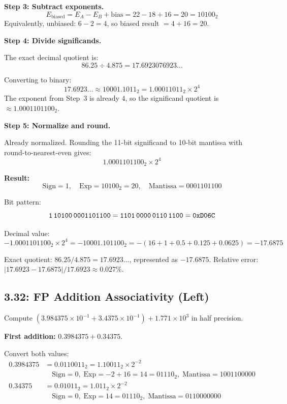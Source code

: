 \noindent\textbf{Step 3: Subtract exponents.}
\[
  E_{\text{biased}} = E_A - E_B + \text{bias} = 22 - 18 + 16 = 20 = 10100_2
\]
Equivalently, unbiased: $6 - 2 = 4$, so biased result $= 4 + 16 = 20$.

\noindent\textbf{Step 4: Divide significands.}

The exact decimal quotient is:
\[
  86.25 \div 4.875 = 17.6923076923\ldots
\]

Converting to binary:
\[
  17.6923\ldots \approx 10001.1011_2 = 1.00011011_2 \times 2^4
\]
The exponent from Step~3 is already $4$, so the significand quotient is
$\approx 1.0001101100_2$.

\noindent\textbf{Step 5: Normalize and round.}

Already normalized. Rounding the 11-bit significand to 10-bit mantissa
with round-to-nearest-even gives:
\[
  1.0001101100_2 \times 2^4
\]

\noindent\textbf{Result:}
\[
  \text{Sign} = 1,\quad
  \text{Exp} = 10100_2 = 20,\quad
  \text{Mantissa} = 0001101100
\]

Bit pattern:
\[
  \texttt{1\,10100\,0001101100}
  = \texttt{1101\,0000\,0110\,1100}
  = \texttt{0xD06C}
\]

Decimal value:
\[
  -1.0001101100_2 \times 2^4
  = -10001.101100_2
  = -(16 + 1 + 0.5 + 0.125 + 0.0625)
  = -17.6875
\]

Exact quotient: $86.25 / 4.875 = 17.6923\ldots$, represented as $-17.6875$.
Relative error: $|17.6923 - 17.6875| / 17.6923 \approx 0.027\%$.

\subsection*{3.32: FP Addition Associativity (Left)}
\hypertarget{sol-3.32}{}

Compute $(3.984375 \times 10^{-1} + 3.4375 \times 10^{-1}) + 1.771 \times 10^{3}$
in half precision.

\noindent\textbf{First addition:} $0.3984375 + 0.34375$.

Convert both values:
\begin{align*}
  0.3984375 &= 0.0110011_2 = 1.10011_2 \times 2^{-2} \\
  &\quad \text{Sign} = 0,\; \text{Exp} = -2 + 16 = 14 = 01110_2,\;
    \text{Mantissa} = 1001100000 \\[4pt]
  0.34375 &= 0.01011_2 = 1.011_2 \times 2^{-2} \\
  &\quad \text{Sign} = 0,\; \text{Exp} = 14 = 01110_2,\;
    \text{Mantissa} = 0110000000
\end{align*}

